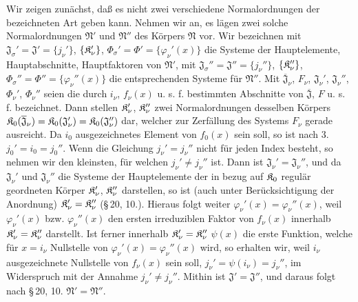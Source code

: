 Wir zeigen zunächst, daß es nicht zwei verschiedene Normalordnungen der bezeichneten Art geben kann. Nehmen wir an, es lägen zwei solche Normalordnungen $\mathfrak N'$ und $\mathfrak N''$ des Körpers $\mathfrak N$ vor. Wir bezeichnen mit $\mathfrak J_\sigma'=\mathfrak J'=\{j_\nu'\}$, $\{\mathfrak K_\nu'\}$, $\Phi_\sigma'=\Phi'=\{\varphi_\nu'(x)\}$ die Systeme der Hauptelemente, Hauptabschnitte, Hauptfaktoren von $\mathfrak N'$, mit $\mathfrak J_\sigma''=\mathfrak J''=\{j_\nu''\}$, $\{\mathfrak K_\nu''\}$, $\Phi_\sigma''=\Phi''=\{\varphi_\nu''(x)\}$ die entsprechenden Systeme für $\mathfrak N''$. Mit $\overline{\mathfrak J}_\nu$, $F_\nu$, $\mathfrak J_\nu'$, $\mathfrak J_\nu''$, $\Phi_\nu'$, $\Phi_\nu''$ seien die durch $i_\nu$, $f_\nu(x)$ u. s. f. bestimmten Abschnitte von $\overline{\mathfrak J}$, $F$ u. s. f. bezeichnet. Dann stellen $\mathfrak K_\nu'$, $\mathfrak K_\nu''$ zwei Normalordnungen desselben Körpers $\mathfrak K_0(\overline{\mathfrak J}_\nu)=\mathfrak K_0(\mathfrak J_\nu')=\mathfrak K_0(\mathfrak J_\nu'')$ dar, welcher zur Zerfällung des Systems $F_\nu$ gerade ausreicht. Da $i_0$ ausgezeichnetes Element von $f_0(x)$ sein soll, so ist nach 3. $j_0'=i_0=j_0''$. Wenn die Gleichung $j_\nu'=j_\nu''$ nicht für jeden Index besteht, so nehmen wir den kleinsten, für welchen $j_\nu'\neq j_\nu''$ ist. Dann ist $\mathfrak J_\nu'=\mathfrak J_\nu''$, und da $\mathfrak J_\nu'$ und $\mathfrak J_\nu''$ die Systeme der Hauptelemente der in bezug auf $\mathfrak K_0$ regulär geordneten Körper $\mathfrak K_\nu'$, $\mathfrak K_\nu''$ darstellen, so ist (auch unter Berücksichtigung der Anordnung) $\mathfrak K_\nu'=\mathfrak K_\nu''$ (\S\,20, 10.). Hieraus folgt weiter $\varphi_\nu'(x)=\varphi_\nu''(x)$, weil $\varphi_\nu'(x)$ bzw. $\varphi_\nu''(x)$ den ersten irreduziblen Faktor von $f_\nu(x)$ innerhalb $\mathfrak K_\nu'=\mathfrak K_\nu''$ darstellt. Ist ferner innerhalb $\mathfrak K_\nu'=\mathfrak K_\nu''$ $\psi(x)$ die erste Funktion, welche für $x=i_\nu$ Nullstelle von $\varphi_\nu'(x)=\varphi_\nu''(x)$ wird, so erhalten wir, weil $i_\nu$ ausgezeichnete Nullstelle von $f_\nu(x)$ sein soll, $j_\nu'=\psi(i_\nu)=j_\nu''$, im Widerspruch mit der Annahme $j_\nu'\neq j_\nu''$. Mithin ist $\mathfrak J'=\mathfrak J''$, und daraus folgt nach \S\,20, 10. $\mathfrak N'=\mathfrak N''$.

